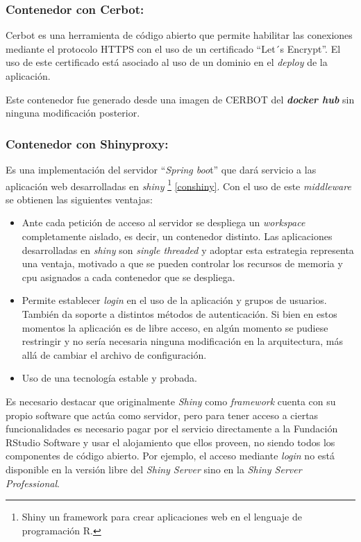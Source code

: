 \documentclass[
  10,
  openany]{book}
\begin{document}
\hypertarget{contenedor-con-cerbot}{%
\subsubsection{Contenedor con Cerbot:}\label{contenedor-con-cerbot}}

Cerbot es una herramienta de código abierto que permite habilitar las conexiones mediante el protocolo HTTPS con el uso de un certificado ``Let´s Encrypt''. El uso de este certificado está asociado al uso de un dominio en el \emph{deploy} de la aplicación.

Este contenedor fue generado desde una imagen de CERBOT del \textbf{\emph{docker hub}} sin ninguna modificación posterior.

\hypertarget{conshinyproxy}{%
\subsubsection{Contenedor con Shinyproxy:}\label{conshinyproxy}}

Es una implementación del servidor ``\emph{Spring boo}t'' que dará servicio a las aplicación web desarrolladas en \emph{shiny} \footnote{Shiny un framework para crear aplicaciones web en el lenguaje de programación R.} \ref{conshiny}. Con el uso de este \emph{middleware} se obtienen las siguientes ventajas:

\begin{itemize}
\item
  Ante cada petición de acceso al servidor se despliega un \emph{workspace} completamente aislado, es decir, un contenedor distinto. Las aplicaciones desarrolladas en \emph{shiny} son \emph{single threaded} y adoptar esta estrategia representa una ventaja, motivado a que se pueden controlar los recursos de memoria y cpu asignados a cada contenedor que se despliega.
\item
  Permite establecer \emph{login} en el uso de la aplicación y grupos de usuarios. También da soporte a distintos métodos de autenticación. Si bien en estos momentos la aplicación es de libre acceso, en algún momento se pudiese restringir y no sería necesaria ninguna modificación en la arquitectura, más allá de cambiar el archivo de configuración.
\item
  Uso de una tecnología estable y probada.
\end{itemize}

Es necesario destacar que originalmente \emph{Shiny} como \emph{framework} cuenta con su propio software que actúa como servidor, pero para tener acceso a ciertas funcionalidades es necesario pagar por el servicio directamente a la Fundación RStudio Software y usar el alojamiento que ellos proveen, no siendo todos los componentes de código abierto. Por ejemplo, el acceso mediante \emph{login} no está disponible en la versión libre del \emph{Shiny Server} sino en la \emph{Shiny Server Professional}.
\end{document}
